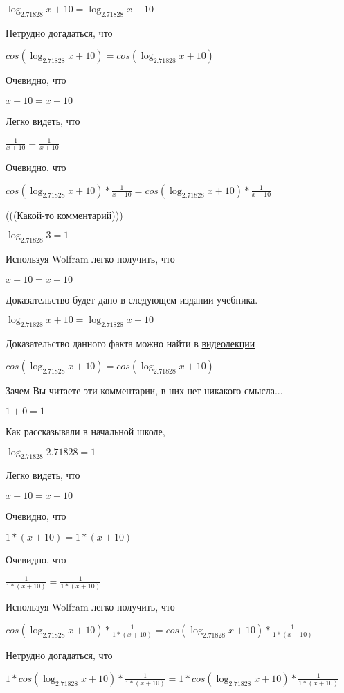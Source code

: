 \documentclass[12pt,a4paper,fleqn]{article}
\theoremstyle{definition}
\begin{document}
$\log_{ 2.71828 }{ x  +  10 } = \log_{ 2.71828 }{ x  +  10 }$

Нетрудно догадаться, что

$cos(\log_{ 2.71828 }{ x  +  10 }) = cos(\log_{ 2.71828 }{ x  +  10 })$

Очевидно, что

$ x  +  10  =  x  +  10 $

Легко видеть, что

$\frac{ 1 }{ x  +  10 }
 = \frac{ 1 }{ x  +  10 }
$

Очевидно, что

$cos(\log_{ 2.71828 }{ x  +  10 }) * \frac{ 1 }{ x  +  10 }
 = cos(\log_{ 2.71828 }{ x  +  10 }) * \frac{ 1 }{ x  +  10 }
$

(((Какой-то комментарий)))

$\log_{ 2.71828 }{ 3 } =  1 $

Используя Wolfram легко получить, что

$ x  +  10  =  x  +  10 $

Доказательство будет дано в следующем издании учебника.

$\log_{ 2.71828 }{ x  +  10 } = \log_{ 2.71828 }{ x  +  10 }$

Доказательство данного факта можно найти в \href{https://www.youtube.com/watch?v=dQw4w9WgXcQ}{видеолекции}

$cos(\log_{ 2.71828 }{ x  +  10 }) = cos(\log_{ 2.71828 }{ x  +  10 })$

Зачем Вы читаете эти комментарии, в них нет никакого смысла...

$ 1  +  0  =  1 $

Как рассказывали в начальной школе,

$\log_{ 2.71828 }{ 2.71828 } =  1 $

Легко видеть, что

$ x  +  10  =  x  +  10 $

Очевидно, что

$ 1  * ( x  +  10 ) =  1  * ( x  +  10 )$

Очевидно, что

$\frac{ 1 }{ 1  * ( x  +  10 )}
 = \frac{ 1 }{ 1  * ( x  +  10 )}
$

Используя Wolfram легко получить, что

$cos(\log_{ 2.71828 }{ x  +  10 }) * \frac{ 1 }{ 1  * ( x  +  10 )}
 = cos(\log_{ 2.71828 }{ x  +  10 }) * \frac{ 1 }{ 1  * ( x  +  10 )}
$

Нетрудно догадаться, что

$ 1  * cos(\log_{ 2.71828 }{ x  +  10 }) * \frac{ 1 }{ 1  * ( x  +  10 )}
 =  1  * cos(\log_{ 2.71828 }{ x  +  10 }) * \frac{ 1 }{ 1  * ( x  +  10 )}
$
\end{document}
